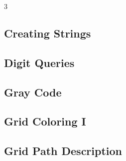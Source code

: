 \documentclass[8pt]{extarticle}
\begin{document}
\begin{multicols*}{3}
\subsection{Creating Strings}
\begin{caixaenunciado}

\end{caixaenunciado}
\vspace{0.3cm}


\subsection{Digit Queries}
\begin{caixaenunciado}

\end{caixaenunciado}
\vspace{0.3cm}


\subsection{Gray Code}
\begin{caixaenunciado}

\end{caixaenunciado}
\vspace{0.3cm}


\subsection{Grid Coloring I}
\begin{caixaenunciado}

\end{caixaenunciado}
\vspace{0.3cm}


\subsection{Grid Path Description}
\begin{caixaenunciado}

\end{caixaenunciado}
\vspace{0.3cm}



\end{multicols*}
\end{document}
